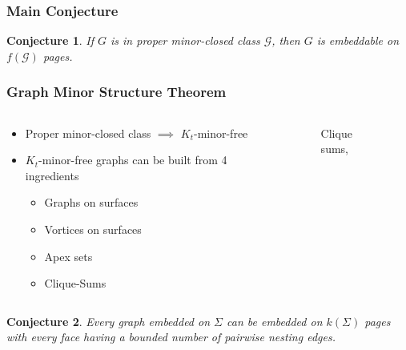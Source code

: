 \documentclass[english]{beamer}
\newtheorem{conjecture}{Conjecture}
\begin{document}
\begin{frame}
  \frametitle{Main Conjecture}
  \begin{conjecture}
    If $G$ is in proper minor-closed class $\mathcal{G}$, then $G$ is embeddable on $f(\mathcal{G})$ pages.
  \end{conjecture}
\end{frame}

\begin{frame}
  \frametitle{Graph Minor Structure Theorem}
  \begin{columns}
    \begin{column}{0.5\textwidth}
      \begin{itemize}
        \item Proper minor-closed class $\implies$ $K_t$-minor-free
        \item $K_t$-minor-free graphs can be built from 4 ingredients \cite{robertsonGraphMinorsXVII1999} \begin{itemize}
                \item Graphs on surfaces
                \item Vortices on surfaces
                \item Apex sets
                \item Clique-Sums
              \end{itemize}
      \end{itemize}
    \end{column}
    \begin{column}{0.5\textwidth}
      \begin{figure}
        \centering
        
        \caption{Clique sums, \cite{eppsteinCliquesum2023}}
      \end{figure}
    \end{column}
  \end{columns}
\end{frame}

\begin{frame}
  \begin{conjecture}
    Every graph embedded on $\Sigma$ can be embedded on $k(\Sigma)$ pages with every face having a bounded number of pairwise nesting edges.
  \end{conjecture}
\end{frame}

\begin{frame}[shrink = 50]

  \printbibliography
\end{frame}
\end{document}
